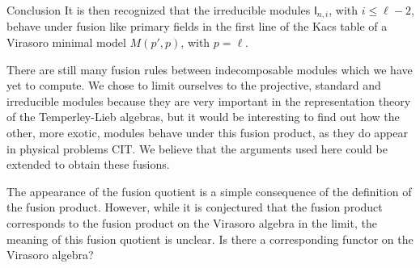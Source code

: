 \documentclass[reqno]{amsart}
\newcommand{\dl}[1]{\mathsf I_{#1}}
\begin{document}
\begin{section}{Conclusion}
It is then recognized that the irreducible modules $\dl{n,i}$, with $i\leq \ell -2$, behave under fusion like primary fields in the first line of the Kacs table of a Virasoro minimal model $M(p',p)$, with $p = \ell$. 

There are still many fusion rules between indecomposable modules which we have yet to compute. We chose to limit ourselves to the projective, standard and irreducible modules because they are very important in the representation theory of the Temperley-Lieb algebras, but it would be interesting to find out how the other, more exotic, modules behave under this fusion product, as they do appear in physical problems CIT. We believe that the arguments used here could be extended to obtain these fusions.

The appearance of the fusion quotient is a simple consequence of the definition of the fusion product. However, while it is conjectured that the fusion product corresponds to the fusion product on the Virasoro algebra in the limit, the meaning of this fusion quotient is unclear. Is there a corresponding functor on the Virasoro algebra?
\end{section}
\appendix
\end{document}
